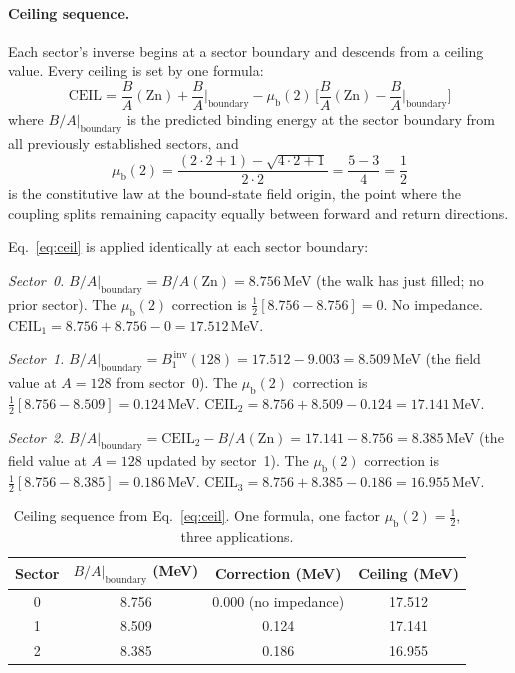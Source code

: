 \documentclass[fleqn,usenatbib]{mnras}
\begin{document}
\paragraph{Ceiling sequence.}
Each sector's inverse begins at a sector boundary and descends from a ceiling value. Every ceiling is set by one formula:
\begin{equation}
\mathrm{CEIL} = \frac{B}{A}(\mathrm{Zn}) + \frac{B}{A}\big|_{\mathrm{boundary}} - \mu_{\mathrm{b}}(2)\,\bigg[\frac{B}{A}(\mathrm{Zn}) - \frac{B}{A}\big|_{\mathrm{boundary}}\bigg]
\label{eq:ceil}
\end{equation}
where $B/A|_{\mathrm{boundary}}$ is the predicted binding energy at the sector boundary from all previously established sectors, and
\begin{equation}
\mu_{\mathrm{b}}(2) = \frac{(2 \cdot 2 + 1) - \sqrt{4 \cdot 2 + 1}}{2 \cdot 2} = \frac{5 - 3}{4} = \frac{1}{2}
\end{equation}
is the constitutive law at the bound-state field origin, the point where the coupling splits remaining capacity equally between forward and return directions.

Eq.~\ref{eq:ceil} is applied identically at each sector boundary:

\emph{Sector~0.} $B/A|_{\mathrm{boundary}} = B/A(\mathrm{Zn}) = 8.756$\,MeV (the walk has just filled; no prior sector). The $\mu_{\mathrm{b}}(2)$ correction is $\tfrac{1}{2}[8.756 - 8.756] = 0$. No impedance. $\mathrm{CEIL}_1 = 8.756 + 8.756 - 0 = 17.512$\,MeV.

\emph{Sector~1.} $B/A|_{\mathrm{boundary}} = B_1^{\,\mathrm{inv}}(128) = 17.512 - 9.003 = 8.509$\,MeV (the field value at $A = 128$ from sector~0). The $\mu_{\mathrm{b}}(2)$ correction is $\tfrac{1}{2}[8.756 - 8.509] = 0.124$\,MeV. $\mathrm{CEIL}_2 = 8.756 + 8.509 - 0.124 = 17.141$\,MeV.

\emph{Sector~2.} $B/A|_{\mathrm{boundary}} = \mathrm{CEIL}_2 - B/A(\mathrm{Zn}) = 17.141 - 8.756 = 8.385$\,MeV (the field value at $A = 128$ updated by sector~1). The $\mu_{\mathrm{b}}(2)$ correction is $\tfrac{1}{2}[8.756 - 8.385] = 0.186$\,MeV. $\mathrm{CEIL}_3 = 8.756 + 8.385 - 0.186 = 16.955$\,MeV.

\begin{table}
\centering
\caption{Ceiling sequence from Eq.~\ref{eq:ceil}. One formula, one factor $\mu_{\mathrm{b}}(2) = \tfrac{1}{2}$, three applications.}
\label{tab:ceilings}
\begin{tabular}{cccc}
\hline
Sector & $B/A|_{\mathrm{boundary}}$ (MeV) & Correction (MeV) & Ceiling (MeV) \\
\hline
0 & 8.756 & 0.000 (no impedance) & 17.512 \\
1 & 8.509 & 0.124 & 17.141 \\
2 & 8.385 & 0.186 & 16.955 \\
\hline
\end{tabular}
\end{table}
\end{document}
